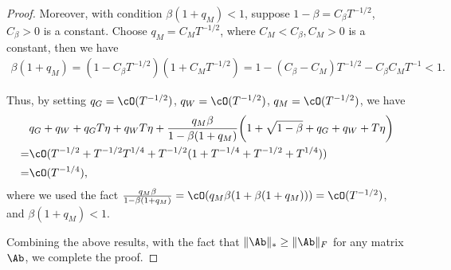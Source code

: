 \documentclass[11pt, letterpaper]{article}
\begin{document}
\begin{proof}
Moreover, with condition $\beta(1+q_M) < 1$, suppose $1-\beta = C_\beta T^{-1/2}$, $C_\beta > 0$ is a constant. Choose $q_M = C_M T^{-1/2}$, where $C_M < C_\beta, C_M > 0$ is a constant, then we have
\begin{align*}
    \beta(1+q_M) = (1 - C_\beta T^{-1/2})(1 + C_M T^{-1/2}) = 1 - (C_\beta - C_M)T^{-1/2} - C_\beta C_M T^{-1} < 1.
\end{align*}

Thus, by setting $q_G = \cO(T^{-1/2})$, $q_W = \cO(T^{-1/2})$, $q_M = \cO(T^{-1/2})$, we have
\begin{align*}
    &q_G+ q_W + q_G T\eta + q_W T\eta + \frac{q_M\beta}{1-\beta(1+q_M)}\bigg(1+\sqrt{1-\beta} + q_G + q_W + T\eta\bigg) \\
    =& \cO(T^{-1/2} + T^{-1/2}T^{1/4} + T^{-1/2}(1+T^{-1/4}+T^{-1/2}+T^{1/4})) \\
    =& \cO(T^{-1/4}),
\end{align*}
where we used the fact $\frac{q_M\beta}{1-\beta(1+q_M)} = \cO(q_M\beta(1+\beta(1+q_M))) = \cO(T^{-1/2})$, and $\beta(1+q_M) < 1$.

Combining the above results, with the fact that $\|\Ab\|_* \ge \|\Ab\|_F$ for any matrix $\Ab$, we complete the proof.


\end{proof}
\end{document}
